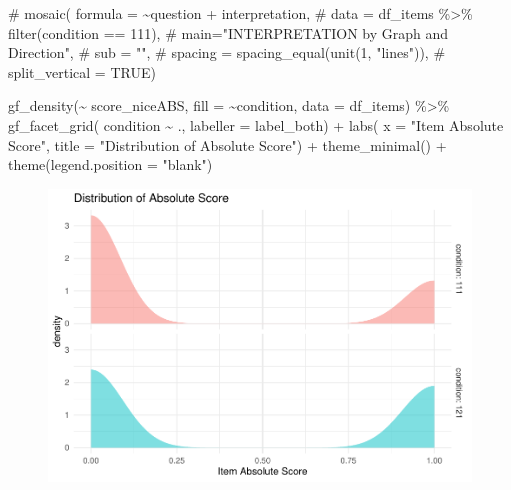 \documentclass[
  letterpaper,
  DIV=11,
  numbers=noendperiod]{scrreprt}
\newenvironment{Shaded}{\begin{snugshade}}{\end{snugshade}}
\newcommand{\AttributeTok}[1]{\textcolor[rgb]{0.40,0.45,0.13}{#1}}
\newcommand{\CommentTok}[1]{\textcolor[rgb]{0.37,0.37,0.37}{#1}}
\newcommand{\FunctionTok}[1]{\textcolor[rgb]{0.28,0.35,0.67}{#1}}
\newcommand{\NormalTok}[1]{\textcolor[rgb]{0.00,0.23,0.31}{#1}}
\newcommand{\SpecialCharTok}[1]{\textcolor[rgb]{0.37,0.37,0.37}{#1}}
\newcommand{\StringTok}[1]{\textcolor[rgb]{0.13,0.47,0.30}{#1}}
\begin{document}
\begin{Shaded}
\begin{Highlighting}[]
\CommentTok{\# mosaic( formula = \textasciitilde{}question + interpretation,}
\CommentTok{\#        data = df\_items \%\textgreater{}\% filter(condition == 111),}
\CommentTok{\#        main="INTERPRETATION by Graph and Direction",}
\CommentTok{\#        sub = "",}
\CommentTok{\#        spacing = spacing\_equal(unit(1, "lines")),}
\CommentTok{\#        split\_vertical = TRUE)}
\end{Highlighting}
\end{Shaded}

\begin{Shaded}
\begin{Highlighting}[]
\FunctionTok{gf\_density}\NormalTok{(}\SpecialCharTok{\textasciitilde{}}\NormalTok{ score\_niceABS, }\AttributeTok{fill =} \SpecialCharTok{\textasciitilde{}}\NormalTok{condition, }\AttributeTok{data =}\NormalTok{ df\_items) }\SpecialCharTok{\%\textgreater{}\%} 
  \FunctionTok{gf\_facet\_grid}\NormalTok{( condition }\SpecialCharTok{\textasciitilde{}}\NormalTok{ ., }\AttributeTok{labeller =}\NormalTok{ label\_both) }\SpecialCharTok{+} 
  \FunctionTok{labs}\NormalTok{( }\AttributeTok{x =} \StringTok{"Item Absolute Score"}\NormalTok{, }\AttributeTok{title =} \StringTok{"Distribution of Absolute Score"}\NormalTok{) }\SpecialCharTok{+} \FunctionTok{theme\_minimal}\NormalTok{() }\SpecialCharTok{+} \FunctionTok{theme}\NormalTok{(}\AttributeTok{legend.position =} \StringTok{"blank"}\NormalTok{)}
\end{Highlighting}
\end{Shaded}

\begin{figure}[H]

{\centering \includegraphics{analysis/SGC3A/2_sgc3A_scoring_files/figure-pdf/unnamed-chunk-81-1.pdf}

}

\end{figure}
\end{document}
